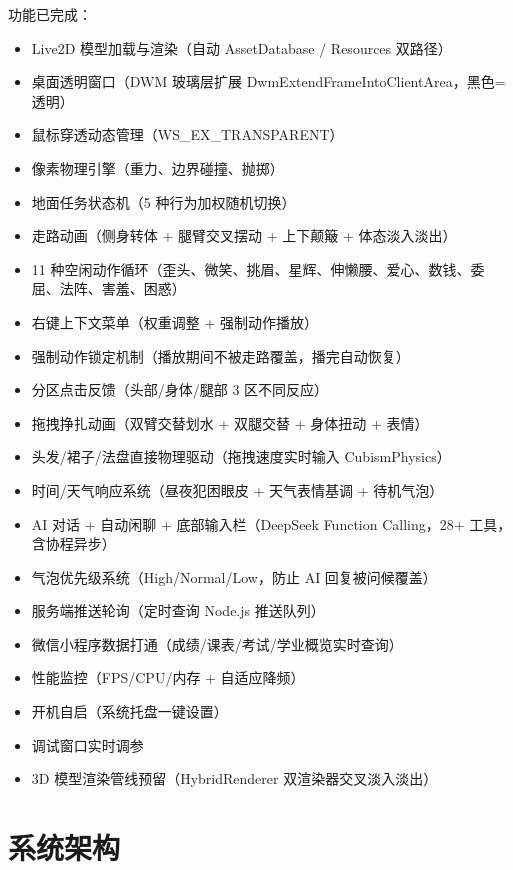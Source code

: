 \documentclass[12pt,a4paper]{ctexart}
\begin{document}
功能已完成：
\begin{itemize}
    \item Live2D 模型加载与渲染（自动 AssetDatabase / Resources 双路径）
    \item 桌面透明窗口（DWM 玻璃层扩展 DwmExtendFrameIntoClientArea，黑色=透明）
    \item 鼠标穿透动态管理（WS\_EX\_TRANSPARENT）
    \item 像素物理引擎（重力、边界碰撞、抛掷）
    \item 地面任务状态机（5 种行为加权随机切换）
    \item 走路动画（侧身转体 + 腿臂交叉摆动 + 上下颠簸 + 体态淡入淡出）
    \item 11 种空闲动作循环（歪头、微笑、挑眉、星辉、伸懒腰、爱心、数钱、委屈、法阵、害羞、困惑）
    \item 右键上下文菜单（权重调整 + 强制动作播放）
    \item 强制动作锁定机制（播放期间不被走路覆盖，播完自动恢复）
    \item 分区点击反馈（头部/身体/腿部 3 区不同反应）
    \item 拖拽挣扎动画（双臂交替划水 + 双腿交替 + 身体扭动 + 表情）
    \item 头发/裙子/法盘直接物理驱动（拖拽速度实时输入 CubismPhysics）
    \item 时间/天气响应系统（昼夜犯困眼皮 + 天气表情基调 + 待机气泡）
    \item AI 对话 + 自动闲聊 + 底部输入栏（DeepSeek Function Calling，28+ 工具，含协程异步）
    \item 气泡优先级系统（High/Normal/Low，防止 AI 回复被问候覆盖）
    \item 服务端推送轮询（定时查询 Node.js 推送队列）
    \item 微信小程序数据打通（成绩/课表/考试/学业概览实时查询）
    \item 性能监控（FPS/CPU/内存 + 自适应降频）
    \item 开机自启（系统托盘一键设置）
    \item 调试窗口实时调参
    \item 3D 模型渲染管线预留（HybridRenderer 双渲染器交叉淡入淡出）
\end{itemize}

\section{系统架构}
\end{document}
